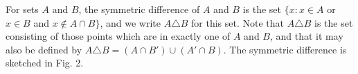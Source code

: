 For sets $A$ and $B$, the symmetric difference of $A$ and $B$ is the set $\{x : x \in A$ or $x \in B$ and $x \notin A \cap B\}$, and we write $A \triangle B$ for this set. Note that $A \triangle B$ is the set consisting of those points which are in exactly one of $A$ and $B$, and that it may also be defined by $A \triangle B = (A \cap B') \cup (A' \cap B)$. The symmetric difference is sketched in Fig. 2.